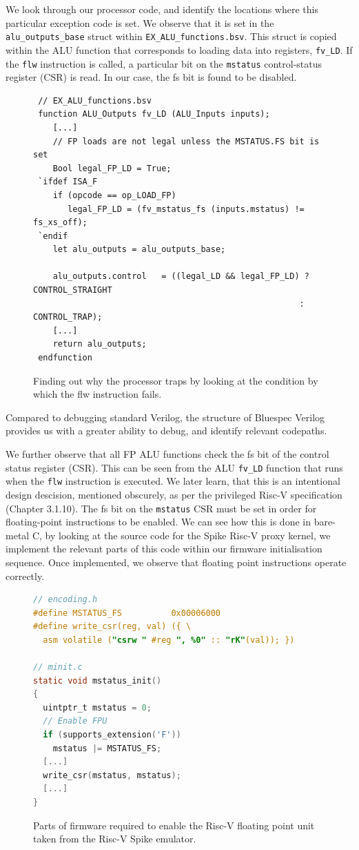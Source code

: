 \documentclass[a4paper,8pt]{report}
\begin{document}
We look through our processor code, and identify the locations where this
particular exception code is set. We observe that it is set in the
\texttt{alu\_outputs\_base} struct within \texttt{EX\_ALU\_functions.bsv}. This
struct is copied within the ALU function that corresponds to loading data into
registers, \texttt{fv\_LD}. If the \texttt{flw} instruction is called, a
particular bit on the \texttt{mstatus} control-status register (CSR) is read. In
our case, the fs bit is found to be disabled.
\begin{figure}[h]
\begin{verbatim}
 // EX_ALU_functions.bsv
 function ALU_Outputs fv_LD (ALU_Inputs inputs);
    [...]
    // FP loads are not legal unless the MSTATUS.FS bit is set
    Bool legal_FP_LD = True;
 `ifdef ISA_F
    if (opcode == op_LOAD_FP)
       legal_FP_LD = (fv_mstatus_fs (inputs.mstatus) != fs_xs_off);
 `endif
    let alu_outputs = alu_outputs_base;

    alu_outputs.control   = ((legal_LD && legal_FP_LD) ? CONTROL_STRAIGHT
                                                      : CONTROL_TRAP);
    [...]
    return alu_outputs;
 endfunction
\end{verbatim}
\caption{Finding out why the processor traps by looking at the condition by
  which the flw instruction fails.}
\end{figure}

Compared to debugging standard Verilog, the structure of Bluespec Verilog
provides us with a greater ability to debug, and identify relevant codepaths.

We further observe that all FP ALU functions check the fs bit of the control
status register (CSR).
This can be seen from the ALU \texttt{fv\_LD} function that runs when the
\texttt{flw} instruction is executed. We later learn, that this is an intentional design descision,
mentioned obscurely, as per the privileged Risc-V
specification\cite{Waterman:EECS-2016-161} (Chapter 3.1.10). The fs bit on the
\texttt{mstatus} CSR must be set in order for floating-point instructions to be
enabled. We can see how this is done in bare-metal C, by looking at the source
code for the Spike\cite{spike} Risc-V proxy kernel, we implement the relevant parts of this code within our firmware
initialisation sequence. Once implemented, we observe that floating point
instructions operate correctly.
\begin{figure}[h]
\begin{lstlisting}[language=C,style=customc]
// encoding.h
#define MSTATUS_FS          0x00006000
#define write_csr(reg, val) ({ \
  asm volatile ("csrw " #reg ", %0" :: "rK"(val)); })

// minit.c
static void mstatus_init()
{
  uintptr_t mstatus = 0;
  // Enable FPU
  if (supports_extension('F'))
    mstatus |= MSTATUS_FS;
  [...]
  write_csr(mstatus, mstatus);
  [...]
}
\end{lstlisting}
\caption{Parts of firmware required to enable the Risc-V floating point unit
  taken from the Risc-V Spike emulator.}
\end{figure}
\end{document}

